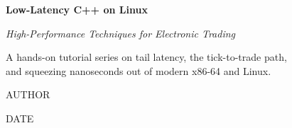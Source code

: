 \begin{titlepage}
\centering
\thispagestyle{empty}

{\Huge\bfseries Low-Latency C++ on Linux\par}
\vspace{1.2em}
{\large\itshape High-Performance Techniques for Electronic Trading\par}

\vspace{2.5em}
{\normalsize A hands-on tutorial series on tail latency, the tick-to-trade path,\\
and squeezing nanoseconds out of modern x86-64 and Linux.\par}


{\large {{AUTHOR}}\par}
\vspace{0.6em}
{\normalsize {{DATE}}\par}

\end{titlepage}
\cleardoublepage
